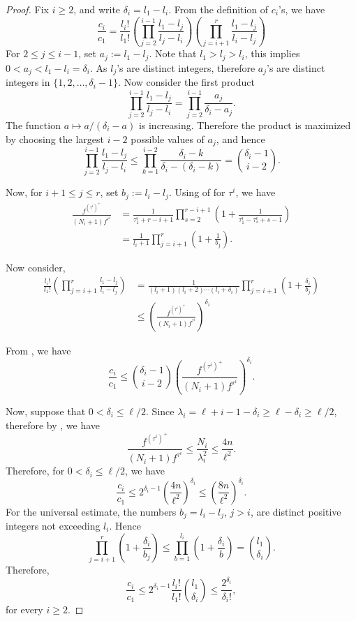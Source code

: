 \documentclass[12pt]{article}
\theoremstyle{definition}
\newcommand{\1}{\mathbf 1}
\begin{document}
\begin{proof}
 Fix $i\geq 2$, and write $\delta_i=l_1-l_i$.  From the definition of $c_i$'s, we have
 \begin{equation}\label{eq:c_i/c_1}
     \frac{c_i}{c_1}=\frac{l_i!}{l_1!}\left(\prod_{j=2}^{i-1}\frac{l_1-l_j}{l_j-l_i}\right)\left(\prod_{j=i+1}^{r}\frac{l_1-l_j}{l_i-l_j}\right)
 \end{equation}
 For $2\leq j\leq i-1$, set $a_j:=l_1-l_j$. Note that $l_1>l_j>l_i$, this implies $0<a_j<l_1-l_i=\delta_i$. As $l_j$'s are distinct integers, therefore $a_j$'s are distinct integers in $\{1,2,\ldots,\delta_i-1\}$. Now consider
 the first product
 $$\prod_{j=2}^{i-1}\frac{l_1-l_j}{l_j-l_i}=\prod_{j=2}^{i-1}\frac{a_j}{\delta_i-a_j}.$$
 The function $a\mapsto a/(\delta_i-a)$ is increasing. Therefore the product is
maximized by choosing the largest $i-2$ possible values of $a_j$, and hence
\begin{equation}\label{eq:first-product}
 \prod_{j=2}^{i-1}\frac{l_1-l_j}{l_j-l_i}
 \le \prod_{k=1}^{i-2}\frac{\delta_i-k}{\delta_i-(\delta_i-k)}
 =\binom{\delta_i-1}{i-2}.
\end{equation}

Now, for $i+1\leq j\leq r$, set $b_j:=l_i-l_j$. Using  of  for $\tau^i$, we have
\begin{align*}
    \frac{f^{(\tau^i)^+}}{(N_i+1)f^{\tau^i}}&=\frac{1}{\tau^i_1+r-i+1}\prod_{s=2}^{r-i+1}\left(1+\frac{1}{\tau^i_1-\tau^i_s+s-1}\right)\\
    &=\frac{1}{l_i+1}\prod_{j=i+1}^{r}\left(1+\frac{1}{b_j}\right).
\end{align*}

Now consider,
\begin{align}
    \frac{l_i!}{l_1!}\left(\prod_{j=i+1}^{r}\frac{l_1-l_j}{l_i-l_j}\right)&=\frac{1}{(l_i+1)(l_i+2)\cdots(l_i+\delta_i)}\prod_{j=i+1}^{r}\left(1+\frac{\delta_i}{b_j}\right)\nonumber\\
   &\le\left(\frac{f^{(\tau^i)^+}}{(N_i+1)f^{\tau^i}}\right)^{\delta_i}\label{eq:second-product}
\end{align}

From , we have 
$$\frac{c_i}{c_1}\leq \binom{\delta_i-1}{i-2}\left(\frac{f^{(\tau^i)^+}}{(N_i+1)f^{\tau^i}}\right)^{\delta_i}.$$

Now, suppose that $0<\delta_i\leq \ell/2$. Since $\lambda_i=\ell+i-1-\delta_i\geq \ell-\delta_i\geq \ell/2$, therefore by , we have 
$$\frac{f^{(\tau^i)^+}}{(N_i+1)f^{\tau^i}}\leq \frac{N_i}{\lambda_i^2}\leq \frac{4n}{\ell^2}.$$
Therefore, for $0<\delta_i\leq \ell/2$, we have 
$$\frac{c_i}{c_1}\leq 2^{\delta_i-1}\left(\frac{4n}{\ell^2}\right)^{\delta_i}\leq \left(\frac{8n}{\ell^2}\right)^{\delta_i}.$$
For the universal estimate, the numbers $b_j=l_i-l_j$, $j>i$, are distinct
positive integers not exceeding $l_i$. Hence
$$
 \prod_{j=i+1}^r\left(1+\frac{\delta_i}{b_j}\right)
 \le\prod_{b=1}^{l_i}\left(1+\frac{\delta_i}{b}\right)
 =\binom{l_1}{\delta_i}.
$$
Therefore, 
$$
 \frac{c_i}{c_1}
 \le2^{\delta_i-1}\frac{l_i!}{l_1!}\binom{l_1}{\delta_i}
 \le\frac{2^{\delta_i}}{\delta_i!},
$$
for every $i\geq2$.
 \end{proof}
\end{document}
